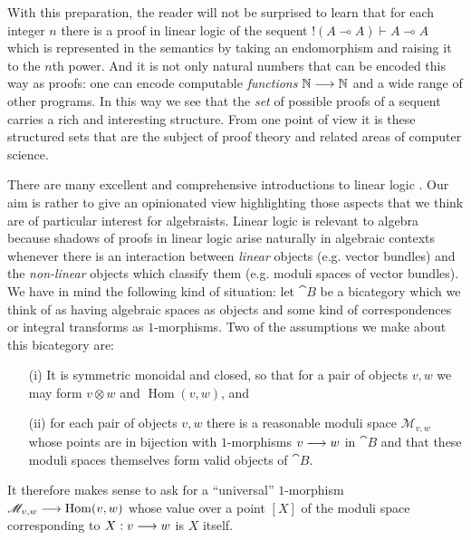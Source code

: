 \documentclass[english,letter paper,12pt,reqno]{article}
\theoremstyle{example}
\numberwithin{equation}{section}
\def\Hom{\operatorname{Hom}}
\begin{document}
With this preparation, the reader will not be surprised to learn that for each integer $n$ there is a proof in linear logic of the sequent ${!} (A \multimap A ) \vdash A \multimap A$ which is represented in the semantics by taking an endomorphism and raising it to the $n$th power. And it is not only natural numbers that can be encoded this way as proofs: one can encode computable \emph{functions} $\mathbb{N} \longrightarrow \mathbb{N}$ and a wide range of other programs. In this way we see that the \emph{set} of possible proofs of a sequent carries a rich and interesting structure. From one point of view it is these structured sets that are the subject of proof theory and related areas of computer science. %

\vspace{0.5cm}

There are many excellent and comprehensive introductions to linear logic \cite{girard_llogic, mellies, abramsky}. Our aim is rather to give an opinionated view highlighting those aspects that we think are of particular interest for algebraists. Linear logic is relevant to algebra because shadows of proofs in linear logic arise naturally in algebraic contexts whenever there is an interaction between \emph{linear} objects (e.g. vector bundles) and the \emph{non-linear} objects which classify them (e.g. moduli spaces of vector bundles). We have in mind the following kind of situation: let $\cat{B}$ be a bicategory which we think of as having algebraic spaces as objects and some kind of correspondences or integral transforms as $1$-morphisms. Two of the assumptions we make about this bicategory are:
\begin{itemize}
\item[(i)] It is symmetric monoidal and closed, so that for a pair of objects $v,w$ we may form $v \otimes w$ and $\Hom(v,w)$, and
\item[(ii)] for each pair of objects $v,w$ there is a reasonable moduli space $\mathscr{M}_{v,w}$ whose points are in bijection with $1$-morphisms $v \longrightarrow w$ in $\cat{B}$ and that these moduli spaces themselves form valid objects of $\cat{B}$.
\end{itemize}
It therefore makes sense to ask for a ``universal'' $1$-morphism $\mathscr{M}_{v,w} \lto \Hom(v,w)$ whose value over a point $[X]$ of the moduli space corresponding to $X: v \longrightarrow w$ is $X$ itself.
\end{document}
